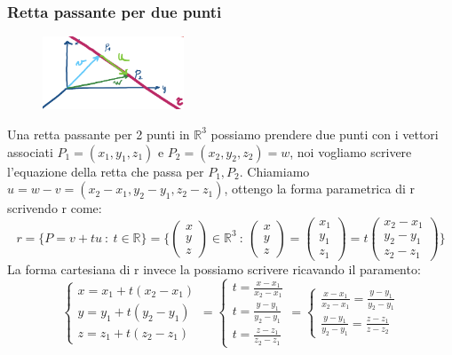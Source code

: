 \subsubsection{Retta passante per due punti}
\begin{figure}
    \vspace{-15pt}
    \centering
    \includegraphics[width=4.2cm]{images/retta-passante-2-punti-R3.png}
\end{figure}
Una retta passante per 2 punti in $\mathbb{R}^3$ possiamo prendere due punti con i vettori associati $P_1 = (x_1, y_1, z_1)$ e $P_2 = (x_2, y_2, z_2) = w$, noi vogliamo scrivere l'equazione della retta che passa per $P_1, P_2$. 
Chiamiamo $u = w-v = (x_2 - x_1, y_2-y_1, z_2-z_1)$, ottengo la forma parametrica di r scrivendo r come:
\[r = \{P = v + tu \::\: t \in \mathbb{R}\} = \Bigg\{ \begin{pmatrix}x\\y\\z\end{pmatrix}\in \mathbb{R}^3 \::\: \begin{pmatrix}x\\y\\z\end{pmatrix} =  \begin{pmatrix}x_1\\y_1\\z_1\end{pmatrix} = t\begin{pmatrix}x_2 - x_1\\y_2 - y_1\\z_2 - z_1\end{pmatrix}\Bigg\}\]
La forma cartesiana di r invece la possiamo scrivere ricavando il paramento:
\[\begin{cases}x=x_1+t(x_2-x_1)\\y=y_1 +t(y_2 - y_1)\\z=z_1 + t(z_2-z_1)\end{cases} = \begin{cases}t = \frac{x-x_1}{x_2 - x_1}\\t = \frac{y-y_1}{y_2 - y_1}\\t=\frac{z-z_1}{z_2-z_1}\end{cases} = \begin{cases}\frac{x-x_1}{x_2-x_1} = \frac{y-y_1}{y_2-y_1}\\\frac{y-y_1}{y_2-y_1} = \frac{z-z_1}{z-z_2}\end{cases}\]

